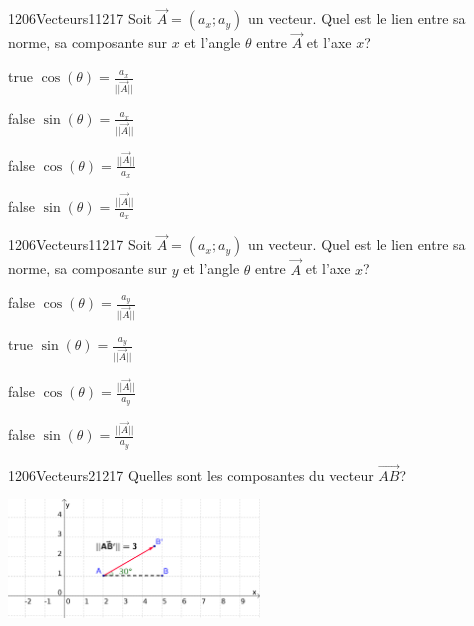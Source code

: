         	\begin{question}{1206}{Vecteurs}{1}{1217}
				Soit $\vec{A}=(a_x;a_y)$ un vecteur. Quel est le lien entre sa norme, sa composante sur $x$ et l'angle $\theta$ entre $\vec{A}$ et l'axe $x$?
            \end{question}
            \begin{reponses}
            	\item[true] $\cos(\theta)=\frac{a_x}{||\vec{A}||}$
            	\item[false] $\sin(\theta)=\frac{a_x}{||\vec{A}||}$
                \item[false] $\cos(\theta)=\frac{||\vec{A}||}{a_x}$
                \item[false] $\sin(\theta)=\frac{||\vec{A}||}{a_x}$
            \end{reponses}
        	\begin{question}{1206}{Vecteurs}{1}{1217}
				Soit $\vec{A}=(a_x;a_y)$ un vecteur. Quel est le lien entre sa norme, sa composante sur $y$ et l'angle $\theta$ entre $\vec{A}$ et l'axe $x$?
            \end{question}
            \begin{reponses}
            	\item[false] $\cos(\theta)=\frac{a_y}{||\vec{A}||}$
            	\item[true] $\sin(\theta)=\frac{a_y}{||\vec{A}||}$
                \item[false] $\cos(\theta)=\frac{||\vec{A}||}{a_y}$
                \item[false] $\sin(\theta)=\frac{||\vec{A}||}{a_y}$
            \end{reponses}
            \begin{question}{1206}{Vecteurs}{2}{1217}
                Quelles sont les composantes du vecteur $\vec{AB}$?\\
                \begin{center}
                	\includegraphics[width=0.5\textwidth]{Philippe/Figures_Philippe/vecteurs_4_6.png}
                \end{center}
            \end{question}
